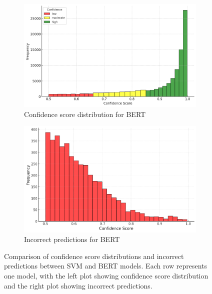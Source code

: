 \begin{figure}[H]
    \begin{subfigure}[t]{0.45\textwidth}
        \centering
        \includegraphics[width=\textwidth]{./figures/confidence_bert.png}
        \caption{Confidence score distribution for BERT}
        \label{fig:confidence_bert}
    \end{subfigure}
    \hfill
    \begin{subfigure}[t]{0.45\textwidth}
        \centering
        \includegraphics[width=\textwidth]{./figures/wrong_bert.png}
        \caption{Incorrect predictions for BERT}
        \label{fig:incorrect_bert}
    \end{subfigure}

    \caption{Comparison of confidence score distributions and incorrect predictions between SVM and BERT models. Each row represents one model, with the left plot showing confidence score distribution and the right plot showing incorrect predictions.}
    \label{fig:confidence_comparison}
\end{figure}

